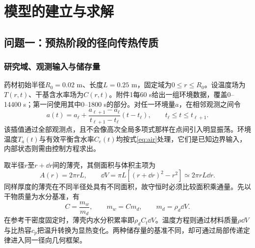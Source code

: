 \section{模型的建立与求解}
\subsection{问题一：预热阶段的径向传热传质}
\subsubsection{研究域、观测输入与储存量}
药材初始半径$R_0=0.02$ m、长度$L=0.25$ m，固定域为$0\le r\le R_0$。设温度场为$T(r,t)$、干基含水率场为$C(r,t)$。附件1每60 s给出一组环境数据，覆盖0--14400 s；第一问使用其中0--1800 s的部分。对任一环境量$a$，在相邻观测之间令
\begin{equation}
a(t)=a_\ell+\frac{a_{\ell+1}-a_\ell}{t_{\ell+1}-t_\ell}(t-t_\ell),
\qquad t_\ell\le t\le t_{\ell+1}.
\label{eq:air}
\end{equation}
该插值通过全部观测点，且不会像高次全局多项式那样在点间引入明显振荡。环境温度$T_a(t)$与有效平衡含水率$C_e(t)$均按式\eqref{eq:air}处理，它们是已知边界输入，内部状态则需由控制方程求出。


取半径$r$至$r+\dd r$间的薄壳，其侧面积与体积主项为
\begin{equation}
A(r)=2\pi rL,\qquad
\dd V=\pi L[(r+\dd r)^2-r^2]\simeq2\pi rL\dd r .
\label{eq:shell}
\end{equation}
同样厚度的薄壳在不同半径处具有不同面积，故守恒时必须比较面积乘通量。先以干物质量为水分基准，有
\begin{equation}
C=\frac{m_w}{m_d},\qquad m_w=Cm_d,\qquad
m_d=\rho_d\dd V .
\label{eq:drybasis}
\end{equation}
在参考干密度固定时，薄壳内水分积累率即$\rho_d C_t\dd V$。温度方程则通过材料质量$\rho\dd V$与比热容$c_p$把温升转换为显热变化。两种储存量的基准不同，却可通过局部传递定律进入同一径向几何框架\cite{crank,patankar}。

\nextpage
